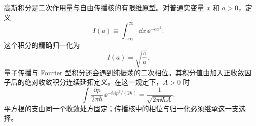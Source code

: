 
高斯积分是二次作用量与自由传播核的有限维原型。对普通实变量 $x$ 和 $a>0$，定义
\begin{equation}
 I(a)\equiv\int_{-\infty}^{\infty}\dd x\,\ee^{-ax^2}.
 \label{eq:real-gaussian-definition-dp68}
\end{equation}
这个积分的精确归一化为
\begin{equation}
 {I(a)=\sqrt{\frac{\pi}{a}}.}
 \label{eq:real-gaussian-r15}
\end{equation}
量子传播与 Fourier 型积分还会遇到纯振荡的二次相位。其积分值由加入正收敛因子后的绝对收敛积分连续延拓定义。在这一规定下，$A>0$ 时
\begin{equation}
 {
 \int\frac{\dd p}{2\pi\hbar}\,
 \ee^{-\ii A p^2/(2\hbar)}
 =\frac{1}{\sqrt{2\pi\ii\hbar A}}.}
 \label{eq:fresnel-normalized-r15}
\end{equation}
平方根的支由同一个收敛处方固定；传播核中的相位与归一化必须继承这一支选择。

